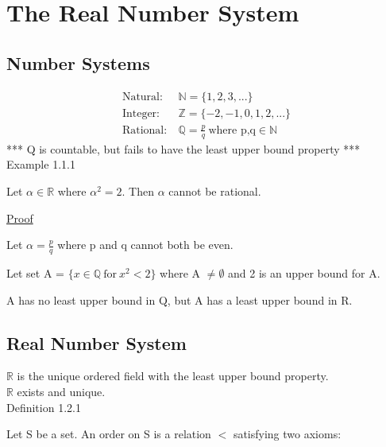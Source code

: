 \newpage
\section[Day 1: The Real Number System]{The Real Number System}





\subsection{Number Systems}

\begin{align*}
	\text{Natural}:\ & \mathbb{N} = \{1, 2, 3, ... \} \\
	
	\text{Integer}:\ & \mathbb{Z} = \{-2, -1, 0, 1, 2, ... \} \\
	
	\text{Rational}:\ & \mathbb{Q} = \frac{p}{q} \ \text{where p,q} \in \mathbb{N}
\end{align*}
*** Q is countable, but fails to have the least upper bound property *** \\

{ \color{purple} Example 1.1.1 }

\qquad Let $ \alpha \in \mathbb{R} $ where $ \alpha^2 = 2 $. Then $ \alpha $ cannot be rational.

{ \color{magenta} \underline{Proof} }

Let $ \alpha = \frac{p}{q} $ where p and q cannot both be even.

Let set A = $\{ x \in \mathbb{Q} \ \text{for} \ x^2 < 2 \} $ where A $ \neq \emptyset $
and 2 is an upper bound for A.

A has no least upper bound in Q, but A has a least upper bound in R.





\subsection{Real Number System}

$ \mathbb{R} $ is the unique ordered field with the least upper bound property. \\
$ \mathbb{R} $ exists and unique. \\

{ \color{blue} Definition 1.2.1 }

\qquad Let S be a set. An order on S is a relation $<$ satisfying two axioms:


